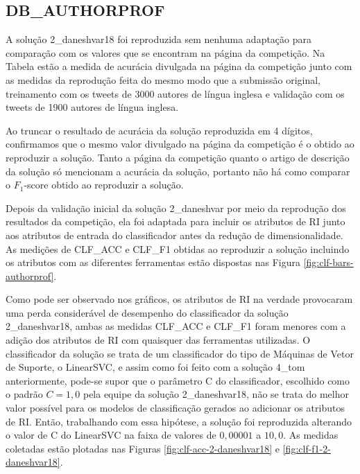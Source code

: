 		\subsection{DB\_AUTHORPROF}
			A solução 2\_daneshvar18 foi reproduzida sem nenhuma adaptação para comparação com os valores que se encontram na página da competição.
			Na Tabela estão a medida de acurácia divulgada na página da competição \cite{PAN_APCLEF_2018} junto com as medidas da reprodução feita do mesmo modo que a submissão original, treinamento com os tweets de 3000 autores de língua inglesa e validação com os tweets de 1900 autores de língua inglesa.

			

			Ao truncar o resultado de acurácia da solução reproduzida em 4 dígitos, confirmamos que o mesmo valor divulgado na página da competição é o obtido ao reproduzir a solução.
			Tanto a página da competição quanto o artigo de descrição da solução \cite{daneshvar:2018} só mencionam a acurácia da solução, portanto não há como comparar o $F_1$-score obtido ao reproduzir a solução.

			Depois da validação inicial da solução 2\_daneshvar por meio da reprodução dos resultados da competição, ela foi adaptada para incluir os atributos de RI junto aos atributos de entrada do classificador antes da redução de dimensionalidade.
			As medições de CLF\_ACC e CLF\_F1 obtidas ao reproduzir a solução incluindo os atributos com as diferentes ferramentas estão dispostas nas Figura \ref{fig:clf-bars-authorprof}.

			




			Como pode ser observado nos gráficos, os atributos de RI na verdade provocaram uma perda considerável de desempenho do classificador da solução 2\_daneshvar18, ambas as medidas CLF\_ACC e CLF\_F1 foram menores com a adição dos atributos de RI com quaisquer das ferramentas utilizadas.
			O classificador da solução se trata de um classificador do tipo de Máquinas de Vetor de Suporte, o LinearSVC, e assim como foi feito com a solução 4\_tom anteriormente, pode-se supor que o parâmetro C do classificador, escolhido como o padrão $C = 1,0$ pela equipe da solução 2\_daneshvar18, não se trata do melhor valor possível para os modelos de classificação gerados ao adicionar os atributos de RI.
			Então, trabalhando com essa hipótese, a solução foi reproduzida alterando o valor de C do LinearSVC na faixa de valores de $0,00001$ a $10,0$.
			As medidas coletadas estão plotadas nas Figuras \ref{fig:clf-acc-2-daneshvar18} e \ref{fig:clf-f1-2-daneshvar18}.


